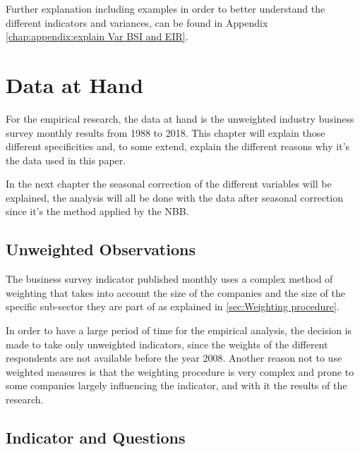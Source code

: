\documentclass[12pt,a4paper,oneside]{book}
\begin{document}
Further explanation including examples in order to better understand the different indicators and variances, can be found in Appendix \autoref{chap:appendix:explain Var BSI and EIR}.




\chapter{Data at Hand}

For the empirical research, the data at hand is the unweighted industry business survey monthly results from 1988 to 2018.
This chapter will explain those different specificities and, to some extend, explain the different reasons why it's the data used in this paper.

In the next chapter the seasonal correction of the different variables will be explained, the analysis will all be done with the data after seasonal correction since it's the method applied by the NBB.

\section{Unweighted Observations}

The business survey indicator published monthly uses a complex method of weighting that takes into account the size of the companies and the size of the specific sub-sector they are part of as explained in \autoref{sec:Weighting procedure}.

In order to have a large period of time for the empirical analysis, the decision is made to take only unweighted indicators, since the weights of the different respondents are not available before the year 2008. 
Another reason not to use weighted measures is that the weighting procedure is very complex and prone to some companies largely influencing the indicator, and with it the results of the research. 





\section{Indicator and Questions}
\end{document}
